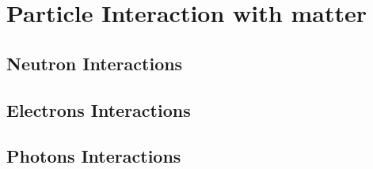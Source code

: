 \section{Particle Interaction with matter}
\subsection{Neutron Interactions}
\subsection{Electrons Interactions}
\subsection{Photons Interactions}
